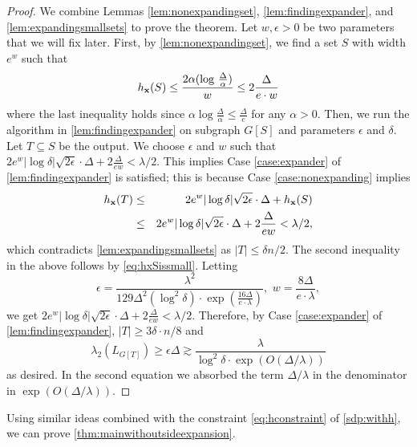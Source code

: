 \documentclass[11pt]{article}
\def\bx{{\bf x}}
\def\eps{\epsilon}
\begin{document}
\mainthm*
\begin{proof}We combine Lemmas \ref{lem:nonexpandingset}, \ref{lem:findingexpander}, and \ref{lem:expandingsmallsets} to prove the theorem. Let $w,\epsilon >0$ be two parameters that we will fix later. First, by  \autoref{lem:nonexpandingset}, we find a set 
$S$ with width $e^w$ such that 
\begin{equation}\label{eq:hxSissmall}h_\bx(S) \leq \frac{2\alpha(\log \, 
\frac{\Delta}{\alpha})}{w}\leq 2\frac{\Delta}{e\cdot w}
\end{equation}
where the last 
inequality holds since $\alpha \log \frac{\Delta}{\alpha}\leq 
\frac{\Delta}{e}$ for any $\alpha>0$. Then, we run the algorithm in  
\autoref{lem:findingexpander} 
on subgraph $G[S]$ and parameters $\epsilon$ and $\delta$. Let $T 
\subseteq S$ be the  output. We choose $\epsilon$ and 
$w$ such that $2e^w|\log\delta|\sqrt{2\epsilon}\cdot \Delta
+2\frac{\Delta}{ew} < \lambda/2$. 
This implies  Case 
\ref{case:expander} of  \autoref{lem:findingexpander} is satisfied; this is because Case \ref{case:nonexpanding} implies 
\begin{eqnarray*}h_\bx(T) &\leq& 2e^w|\log\delta|\sqrt{2\eps}\cdot\Delta+h_\bx(S)\\
	&\leq&  2e^w|\log\delta|\sqrt{2\epsilon}\cdot \Delta
+2\frac{\Delta}{ew} < \lambda/2,
\end{eqnarray*}
 which contradicts  \autoref{lem:expandingsmallsets} as $|T|\leq\delta n/2$. The second inequality in the above follows by \eqref{eq:hxSissmall}. Letting
$$\epsilon =\frac{{\lambda}^2}{129\Delta^2(\log^2 \delta)\cdot \exp(\frac{16\Delta}
{e\cdot\lambda})}, \, \, w= \frac{8\Delta}{e\cdot \lambda},$$
we get $2e^w|\log\delta|\sqrt{2\epsilon}\cdot \Delta
+2\frac{\Delta}{ew} < \lambda/2$.
Therefore, by Case \ref{case:expander} of \autoref{lem:findingexpander}, $|T| \geq 3\delta \cdot n/8$ and 
$$\lambda_2(L_{G[T]}) \geq \epsilon\Delta\gtrsim \frac{\lambda}{\log^2\delta\cdot\exp(O(\Delta/\lambda))}$$
as desired. In the second equation we absorbed the term $\Delta/\lambda$ in the denominator in $\exp(O(\Delta/\lambda))$.
\end{proof}

Using similar ideas combined with the constraint \eqref{eq:hconstraint} of \ref{sdp:withh}, we can prove  \autoref{thm:mainwithoutsideexpansion}.
\end{document}
